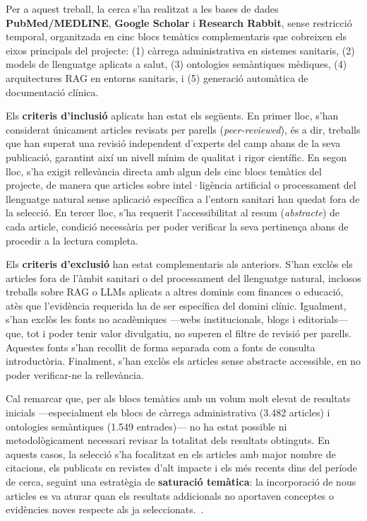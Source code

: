 \documentclass[CAT]{TFUOC}%
\begin{document}
Per a aquest treball, la cerca s'ha realitzat a les bases de dades \textbf{PubMed/MEDLINE}, \textbf{Google Scholar} i \textbf{Research Rabbit}, sense restricció temporal, organitzada en cinc blocs temàtics complementaris que cobreixen els eixos principals del projecte: (1) càrrega administrativa en sistemes sanitaris, (2) models de llenguatge aplicats a salut, (3) ontologies semàntiques mèdiques, (4) arquitectures RAG en entorns sanitaris, i (5) generació automàtica de documentació clínica.

Els \textbf{criteris d'inclusió} aplicats han estat els següents. En primer lloc, s'han considerat únicament articles revisats per parells (\textit{peer-reviewed}), és a dir, treballs que han superat una revisió independent d'experts del camp abans de la seva publicació, garantint així un nivell mínim de qualitat i rigor científic. En segon lloc, s'ha exigit rellevància directa amb algun dels cinc blocs temàtics del projecte, de manera que articles sobre intel·ligència artificial o processament del llenguatge natural sense aplicació específica a l'entorn sanitari han quedat fora de la selecció. En tercer lloc, s'ha requerit l'accessibilitat al resum (\textit{abstracte}) de cada article, condició necessària per poder verificar la seva pertinença abans de procedir a la lectura completa.

Els \textbf{criteris d'exclusió} han estat complementaris als anteriors. S'han exclòs els articles fora de l'àmbit sanitari o del processament del llenguatge natural, inclosos treballs sobre RAG o LLMs aplicats a altres dominis com finances o educació, atès que l'evidència requerida ha de ser específica del domini clínic. Igualment, s'han exclòs les fonts no acadèmiques ---webs institucionals, blogs i editorials--- que, tot i poder tenir valor divulgatiu, no superen el filtre de revisió per parells. Aquestes fonts s'han recollit de forma separada com a fonts de consulta introductòria. Finalment, s'han exclòs els articles sense abstracte accessible, en no poder verificar-ne la rellevància.

Cal remarcar que, per als blocs temàtics amb un volum molt elevat de resultats inicials ---especialment els blocs de càrrega administrativa (3.482 articles) i ontologies semàntiques (1.549 entrades)--- no ha estat possible ni metodològicament necessari revisar la totalitat dels resultats obtinguts. En aquests casos, la selecció s'ha focalitzat en els articles amb major nombre de citacions, els publicats en revistes d'alt impacte i els més recents dins del període de cerca, seguint una estratègia de \textbf{saturació temàtica}: la incorporació de nous articles es va aturar quan els resultats addicionals no aportaven conceptes o evidències noves respecte als ja seleccionats.~\cite{page2021prisma}.
\end{document}

